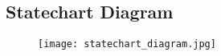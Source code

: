 \subsection{Statechart Diagram}
\begin{figure} [h]
\centering
\texttt{[image: statechart\_diagram.jpg]}
\end{figure}